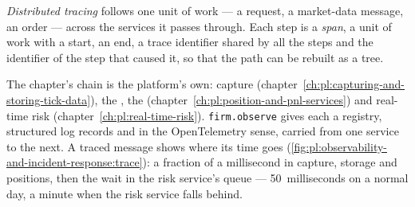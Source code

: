 \begin{definition}\label{def:pl:observability-and-incident-response:trace}
\emph{Distributed tracing} follows one unit of work --- a request, a market-data message, an order --- across the
services it passes through. Each step is a \emph{span}, a unit of work with a start, an end, a trace identifier shared by all the
steps and the identifier of the step that caused it, so that the path can be rebuilt as a tree.
\end{definition}

The chapter's chain is the platform's own: capture (chapter~\ref{ch:pl:capturing-and-storing-tick-data}), the , the  (chapter~\ref{ch:pl:position-and-pnl-services}) and real-time risk (chapter~\ref{ch:pl:real-time-risk}). \texttt{firm.observe} gives
each a  registry, structured log records and  in the OpenTelemetry sense, carried from one service to the next. A traced message
shows where its time goes (\cref{fig:pl:observability-and-incident-response:trace}): a fraction of a millisecond in capture, storage and
positions, then the wait in the risk service's queue --- 50~milliseconds on a normal day, a minute when the risk service falls behind.

\label{lst:pl:observability-and-incident-response:tracer}

